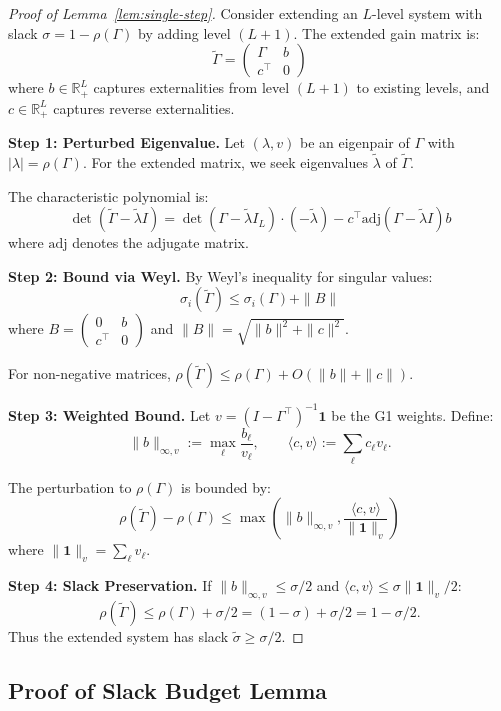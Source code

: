 \documentclass[12pt]{article}
\newcommand{\R}{\mathbb{R}}
\begin{document}
\begin{proof}[Proof of Lemma~\ref{lem:single-step}]
Consider extending an $L$-level system with slack $\sigma = 1 - \rho(\Gamma)$ by adding level $(L+1)$. The extended gain matrix is:
\[
\tilde{\Gamma} = \begin{pmatrix} \Gamma & b \\ c^\top & 0 \end{pmatrix}
\]
where $b \in \R^L_+$ captures externalities from level $(L+1)$ to existing levels, and $c \in \R^L_+$ captures reverse externalities.

\textbf{Step 1: Perturbed Eigenvalue.}
Let $(\lambda, v)$ be an eigenpair of $\Gamma$ with $|\lambda| = \rho(\Gamma)$. For the extended matrix, we seek eigenvalues $\tilde{\lambda}$ of $\tilde{\Gamma}$.

The characteristic polynomial is:
\[
\det(\tilde{\Gamma} - \tilde{\lambda} I) = \det(\Gamma - \tilde{\lambda} I_{L}) \cdot (-\tilde{\lambda}) - c^\top \text{adj}(\Gamma - \tilde{\lambda} I) b
\]
where $\text{adj}$ denotes the adjugate matrix.

\textbf{Step 2: Bound via Weyl.}
By Weyl's inequality for singular values:
\[
\sigma_i(\tilde{\Gamma}) \leq \sigma_i(\Gamma) + \|B\|
\]
where $B = \begin{pmatrix} 0 & b \\ c^\top & 0 \end{pmatrix}$ and $\|B\| = \sqrt{\|b\|^2 + \|c\|^2}$.

For non-negative matrices, $\rho(\tilde{\Gamma}) \leq \rho(\Gamma) + O(\|b\| + \|c\|)$.

\textbf{Step 3: Weighted Bound.}
Let $v = (I - \Gamma^\top)^{-1} \mathbf{1}$ be the G1 weights. Define:
\[
\|b\|_{\infty, v} := \max_\ell \frac{b_\ell}{v_\ell}, \qquad \langle c, v \rangle := \sum_\ell c_\ell v_\ell.
\]

The perturbation to $\rho(\Gamma)$ is bounded by:
\[
\rho(\tilde{\Gamma}) - \rho(\Gamma) \leq \max\left( \|b\|_{\infty, v}, \frac{\langle c, v \rangle}{\|\mathbf{1}\|_v} \right)
\]
where $\|\mathbf{1}\|_v = \sum_\ell v_\ell$.

\textbf{Step 4: Slack Preservation.}
If $\|b\|_{\infty, v} \leq \sigma/2$ and $\langle c, v \rangle \leq \sigma \|\mathbf{1}\|_v / 2$:
\[
\rho(\tilde{\Gamma}) \leq \rho(\Gamma) + \sigma/2 = (1 - \sigma) + \sigma/2 = 1 - \sigma/2.
\]
Thus the extended system has slack $\tilde{\sigma} \geq \sigma/2$.
\end{proof}

\subsection{Proof of Slack Budget Lemma}
\end{document}
